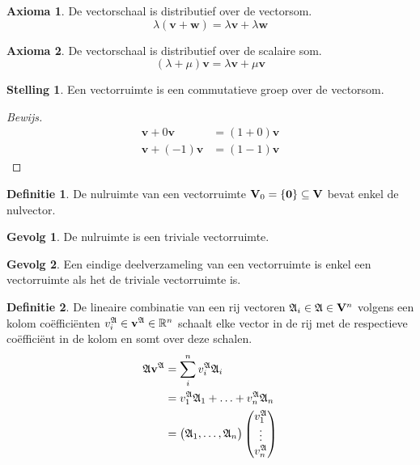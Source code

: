 \documentclass{amsart}
\theoremstyle{definition}
\newtheorem{axm}{Axioma}[section]
\newtheorem{thm}{Stelling}[section]
\newtheorem{dfn}{Definitie}[section]
\newtheorem{csq}{Gevolg}[section]
\newenvironment{bewijs}{\begin{proof}[Bewijs]}{\end{proof}}
\newcommand{\setsm}[1]{\{{#1}\}}
\newcommand{\vecspace}[1][v]{\mathrm{\mathbf{\MakeUppercase#1}}}
\newcommand{\vecspacen}[1][n]{\vecspace^#1}
\newcommand{\vvec}[1][v]{\mathbf{#1}}
\newcommand{\zerovec}{\vvec[0]}
\newcommand{\vecrow}[1][a]{\mathfrak{\MakeUppercase{#1}}}
\newcommand{\rvec}[2][i]{{#2}_{#1}}
\newcommand{\rvecr}[2][i]{\rvec[#1]{\vecrow[#2]}}
\newcommand{\rveci}[1][i]{\rvecr[#1]{a}}
\newcommand{\cvec}[2]{{#1}^{#2}}
\newcommand{\cvecv}[2][v]{\cvec{\vvec[#1]}{#2}}
\newcommand{\cvecva}[1][a]{\cvecv{\vecrow[#1]}}
\newcommand{\vcord}[3]{{#1}_{#2}^{#3}}
\newcommand{\vcordv}[3][v]{\vcord{#1}{#2}{\vecrow[#3]}}
\newcommand{\vcordvi}[2][i]{\vcordv{#1}{#2}}
\newcommand{\vcordvia}[1][i]{\vcordvi[#1]{a}}
\begin{document}
\begin{axm}
	De vectorschaal is distributief over de vectorsom.
	\begin{equation*}
		\lambda(\vvec + \vvec[w]) = \lambda \vvec + \lambda \vvec[w]
	\end{equation*}
\end{axm}

\begin{axm}
	De vectorschaal is distributief over de scalaire som.
	\begin{equation*}
		(\lambda + \mu)\vvec = \lambda \vvec + \mu \vvec
	\end{equation*}
\end{axm}

\begin{thm}
	Een vectorruimte is een commutatieve groep over de vectorsom.
	\begin{bewijs}
		\begin{align*}
			\vvec + 0\vvec    & = (1+0)\vvec \\
			\vvec + (-1)\vvec & = (1-1)\vvec
		\end{align*}
	\end{bewijs}
\end{thm}

\begin{dfn}
	De nulruimte van een vectorruimte $\vecspace_0 = \setsm\zerovec \subseteq \vecspace$ bevat enkel de nulvector.
\end{dfn}

\begin{csq}
	De nulruimte is een triviale vectorruimte.
\end{csq}

\begin{csq}
	Een eindige deelverzameling van een vectorruimte is enkel een vectorruimte als het de triviale vectorruimte is.
\end{csq}

\begin{dfn}
	De lineaire combinatie van een rij vectoren $\rveci \in \vecrow \in \vecspacen$ volgens een kolom coëfficiënten $\vcordvia \in \cvecva \in \mathbb{R}^n$
	schaalt elke vector in de rij met de respectieve coëfficiënt in de kolom en somt over deze schalen.
	\begin{align*}
		\vecrow \cvecva & = \sum_i^n \vcordvia \rveci
		\\ & = \vcordvia[1] \rveci[1] + \ldots + \vcordvia[n] \rveci[n]
		\\ & =
		\begin{pmatrix}
			\rveci[1], \ldots, \rveci[n]
		\end{pmatrix}
		\begin{pmatrix}
			\vcordvia[1] \\
			\vdots       \\
			\vcordvia[n]
		\end{pmatrix}
	\end{align*}
\end{dfn}
\end{document}
